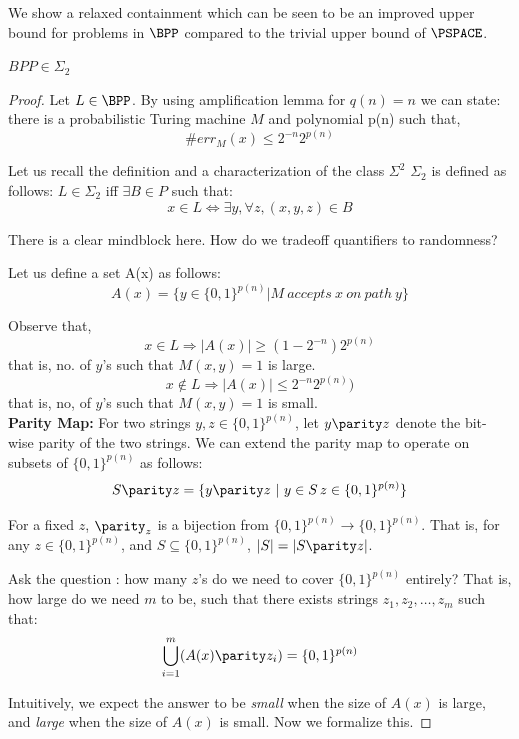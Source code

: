 We show a relaxed containment which can be seen to be an improved upper bound for problems in $\BPP$ compared to the trivial upper bound of $\PSPACE$.

\begin{theorem}
$BPP \in \Sigma_2$
\end{theorem}
\begin{proof}
Let $L \in \BPP$. By using amplification lemma for $q(n) = n$ we can state:
there is a probabilistic Turing machine $M$ and polynomial p(n) such that,
\[\#err_M(x) \leq 2^{-n} 2^{p(n)}\]

Let us recall the definition and a characterization of the class $\Sigma^2$
$\Sigma_2$ is defined as follows:
$L \in \Sigma_2$ iff $\exists B \in P $ such that:
\[x \in L \iff \exists y,  \forall z,  (x,y,z) \in B\]

There is a clear mindblock here. How do we tradeoff quantifiers to randomness?

Let us define a set A(x) as follows:
\[ A(x) = \{y\in \{0,1\}^{p(n)} |  M\ accepts\ x\ on\ path\ y \}\]

Observe that, 
\[x \in L \Rightarrow |A(x)| \geq (1- 2^{-n}) 2^{p(n)} \]
that is, no. of $y$'s such that $M(x,y) = 1$ is large.
\[x \notin L \Rightarrow |A(x)| \leq  2^{-n} 2^{p(n)}) \] 
that is, no, of $y$'s such that $M(x,y) = 1$ is small.
\\

\textbf{Parity Map:}
For two strings $y,z \in \{0,1\}^{p(n)}$, let $y \parity z$ denote the bit-wise parity of the two strings.
We can extend the parity map to operate on subsets of $\{0,1\}^{p(n)}$ as follows:
\[ S \parity z = \{y \parity z ~|~ y \in S \, z \in \{0,1\}^{p(n)} \}\]

\begin{observation}
For a fixed $z$, $\parity_z$ is a bijection from $\{0,1\}^{p(n)} \to \{0,1\}^{p(n)}$. That is, for any $z \in \{0,1\}^{p(n)}$, and $S \subseteq \{0,1\}^{p(n)}$, $|S| =|S \parity z|$.
\end{observation}

Ask the question : how many $z$'s do we need to cover $\{0,1\}^{p(n)}$ entirely?
That is, how large do we need $m$ to be, such that there exists strings $z_1, z_2, \ldots, z_m$ such that:
\[\bigcup_{i=1}^{m} (A(x) \parity z_i) = \{0,1\}^{p(n)}  \]

Intuitively, we expect the answer to be {\em small} when the size of $A(x)$ is large, and {\em large} when the size of $A(x)$ is small. Now we formalize this.


\end{proof}
